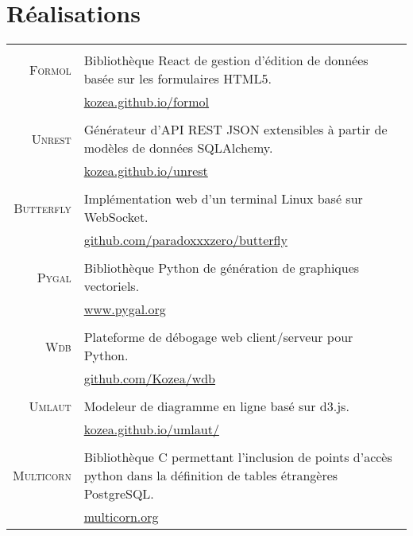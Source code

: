 \documentclass[a4paper,10pt]{article}
\begin{document}
  \section{Réalisations}
  \begin{tabular}{r|p{11cm}}
    \multicolumn{2}{c}{} \\
    \textsc{Formol}
      & Bibliothèque React de gestion d’édition de données basée sur les formulaires HTML5. \\
      & \href{https://kozea.github.io/formol/}{kozea.github.io/formol} \\

    \multicolumn{2}{c}{} \\
    \textsc{Unrest}
      & Générateur d'API REST JSON extensibles à partir de modèles de données SQLAlchemy. \\
      & \href{https://kozea.github.io/unrest/}{kozea.github.io/unrest} \\

    \multicolumn{2}{c}{} \\
    \textsc{Butterfly}
      & Implémentation web d'un terminal Linux basé sur WebSocket. \\
      & \href{https://github.com/paradoxxxzero/butterfly}{github.com/paradoxxxzero/butterfly} \\

    \multicolumn{2}{c}{} \\
    \textsc{Pygal}
      & Bibliothèque Python de génération de graphiques vectoriels. \\
      & \href{http://www.pygal.org/}{www.pygal.org} \\

    \multicolumn{2}{c}{} \\
    \textsc{Wdb}
      & Plateforme de débogage web client/serveur pour Python. \\
      & \href{https://github.com/Kozea/wdb}{github.com/Kozea/wdb} \\

    \multicolumn{2}{c}{} \\
    \textsc{Umlaut}
      & Modeleur de diagramme en ligne basé sur d3.js. \\
      & \href{http://kozea.github.io/umlaut/}{kozea.github.io/umlaut/} \\

    \multicolumn{2}{c}{} \\
    \textsc{Multicorn}
      & Bibliothèque C permettant l’inclusion de points d'accès python dans la définition de tables étrangères PostgreSQL. \\
      & \href{https://multicorn.org/}{multicorn.org} \\


\end{tabular}
\end{document}
